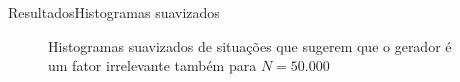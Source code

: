 \documentclass[10pt,xcolor={dvipsnames}]{beamer}
\begin{document}
\begin{frame}{Resultados}{Histogramas suavizados}
\begin{block}{}
\begin{figure} %
	\centering
	\caption{Histogramas suavizados de situações que sugerem que o gerador é um fator irrelevante também para $N=50.000$}\label{fig:GeradorIrrelevante50k}
\end{figure}
\end{block}
\end{frame}
\end{document}
